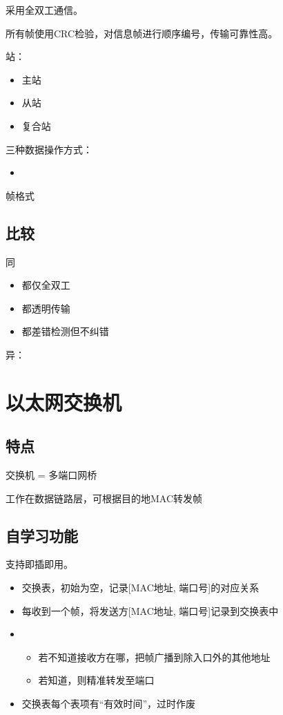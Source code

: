 采用全双工通信。

所有帧使用CRC检验，对信息帧进行顺序编号，传输可靠性高。

站：\begin{itemize}
    \item 主站
    \item 从站
    \item 复合站
\end{itemize}

三种数据操作方式：\begin{itemize}
    \item 
\end{itemize}

帧格式


\subsection{比较}
同\begin{itemize}
    \item 都仅全双工
    \item 都透明传输
    \item 都差错检测但不纠错
\end{itemize}

异：


\section{以太网交换机}

\subsection{特点}
交换机 = 多端口网桥

工作在数据链路层，可根据目的地MAC转发帧


\subsection{自学习功能}
支持即插即用。

\begin{itemize}
    \item 交换表，初始为空，记录[MAC地址, 端口号]的对应关系
    \item 每收到一个帧，将发送方[MAC地址, 端口号]记录到交换表中
    \item \begin{itemize}
        \item 若不知道接收方在哪，把帧广播到除入口外的其他地址
        \item 若知道，则精准转发至端口
    \end{itemize}
    \item 交换表每个表项有“有效时间”，过时作废
\end{itemize}


